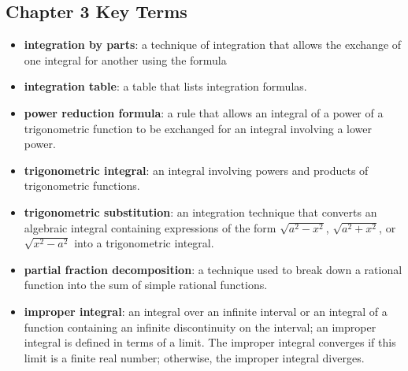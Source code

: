 \documentclass{report}
\begin{document}
    \subsection{Chapter 3 Key Terms}
    \bigbreak \noindent 
    \begin{itemize}
        \item \textbf{integration by parts}: a technique of integration that allows the exchange of one integral for another using the formula 
        \item \textbf{integration table}: a table that lists integration formulas.
        \item \textbf{power reduction formula}: a rule that allows an integral of a power of a trigonometric function to be exchanged for an integral involving a lower power.
        \item \textbf{trigonometric integral}: an integral involving powers and products of trigonometric functions.
        \item \textbf{trigonometric substitution}: an integration technique that converts an algebraic integral containing expressions of the form \( \sqrt{a^2 - x^2} \), \( \sqrt{a^2 + x^2} \), or \( \sqrt{x^2 - a^2} \) into a trigonometric integral.
        \item \textbf{partial fraction decomposition}: a technique used to break down a rational function into the sum of simple rational functions.
        \item \textbf{improper integral}: an integral over an infinite interval or an integral of a function containing an infinite discontinuity on the interval; an improper integral is defined in terms of a limit. The improper integral converges if this limit is a finite real number; otherwise, the improper integral diverges.
    \end{itemize}
\end{document}

